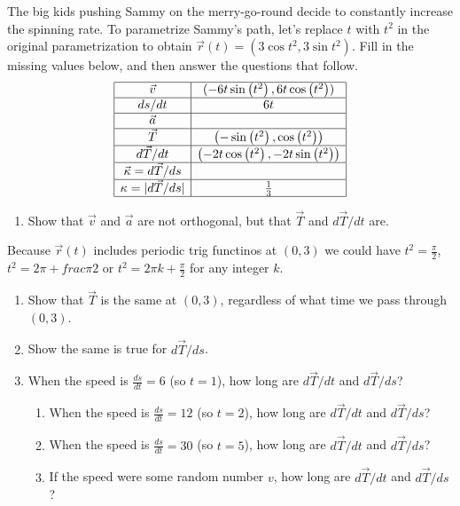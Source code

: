 \begin{problem}
 The big kids pushing Sammy on the merry-go-round decide to constantly increase the spinning rate.  To parametrize Sammy's path, let's replace $t$ with $t^2$ in the original parametrization to obtain $\vec r(t) = (3\cos t^2, 3\sin t^2)$. Fill in the missing values below, and then answer the questions that follow.
$$\begin{array}{|c|c|}\hline
 \vec v & ( -6 t \sin \left(t^2\right),6 t \cos \left(t^2\right) ) \\\hline
 ds/dt & 6 t \\\hline
 \vec a & %
   \\\hline
 \vec T & \left(-\sin \left(t^2\right),\cos \left(t^2\right)\right) 
\\\hline
 d\vec T/dt & \left(-2 t \cos \left(t^2\right),-2 t \sin \left(t^2\right)\right)\\\hline
 \vec \kappa = d\vec T/ds & %
\\\hline
 \kappa =|d\vec T/ds| & \frac{1}{3} \\\hline
\end{array}$$
\begin{enumerate}
 \item Show that $\vec v$ and $\vec a$ are not orthogonal, but that $\vec T$ and $d\vec T/dt$ are. 
\end{enumerate}
Because $\vec r (t)$ includes periodic trig functinos at $(0,3)$ we could have $t^2 = \frac{\pi}{2}$, $t^2=2\pi+frac{\pi}{2}$ or $t^2=2\pi k + \frac{\pi}{2}$ for any integer $k$.
\begin{enumerate}[resume]
	\item Show that $\vec T$ is the same at $(0,3)$, regardless of what time we pass through $(0,3)$. 
	\item Show the same is true for $d\vec T/ds$.
	\item When the speed is $\frac{ds}{dt}=6$ (so $t=1$), how long are $d\vec T/dt$ and $d\vec T/ds$? 
	\begin{enumerate}
		\item When the speed is $\frac{ds}{dt}=12$ (so $t=2$), how long are $d\vec T/dt$ and $d\vec T/ds$? 
		\item When the speed is $\frac{ds}{dt}=30$ (so $t=5$), how long are $d\vec T/dt$ and $d\vec T/ds$? 
		\item If the speed were some random number $v$, how long are $d\vec T/dt$ and $d\vec T/ds$? 
	\end{enumerate}
\end{enumerate}

\end{problem}

